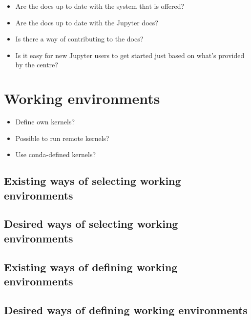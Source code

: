 \documentclass[11pt,a4paper]{article}
\begin{document}
\begin{itemize}
	\item Are the docs up to date with the system that is offered?
	\item Are the docs up to date with the Jupyter docs?
	\item Is there a way of contributing to the docs?
	\item Is it easy for new Jupyter users to get started just based on what's provided by the centre?
\end{itemize}


\section{Working environments}
\label{s-working-envs}

\begin{itemize}
  \item Define own kernels?
  \item Possible to run remote kernels?
  \item Use conda-defined kernels?
\end{itemize}

\subsection{Existing ways of selecting working environments}
\label{ss-existing-env-selection}

\subsection{Desired ways of selecting working environments}
\label{ss-desired-env-selection}

\subsection{Existing ways of defining working environments}
\label{ss-existing-env-definition}

\subsection{Desired ways of defining working environments}
\label{ss-desired-env-definition}

\end{document}
